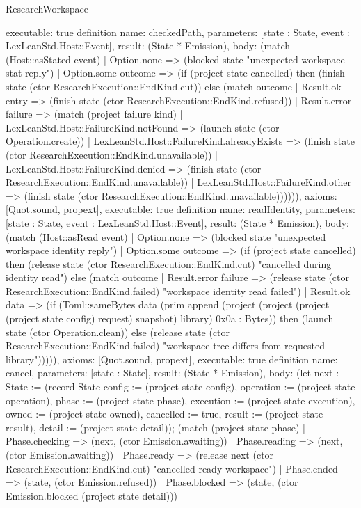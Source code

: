 \begin{lexlean}{ResearchWorkspace}
\begin{semanticmodule}
{ executable: true
}
definition{
 name: checkedPath,
 parameters: [state : State, event : LexLeanStd.Host::Event],
 result: (State * Emission),
 body: (match (Host::asStated event) | Option.none => (blocked state "unexpected workspace stat reply") | Option.some outcome => (if (project state cancelled) then (finish state (ctor ResearchExecution::EndKind.cut)) else (match outcome | Result.ok entry => (finish state (ctor ResearchExecution::EndKind.refused)) | Result.error failure => (match (project failure kind)
 | LexLeanStd.Host::FailureKind.notFound => (launch state (ctor Operation.create))
 | LexLeanStd.Host::FailureKind.alreadyExists => (finish state (ctor ResearchExecution::EndKind.unavailable))
 | LexLeanStd.Host::FailureKind.denied => (finish state (ctor ResearchExecution::EndKind.unavailable))
 | LexLeanStd.Host::FailureKind.other => (finish state (ctor ResearchExecution::EndKind.unavailable)))))),
 axioms: [Quot.sound, propext],
 executable: true
}
definition{
 name: readIdentity,
 parameters: [state : State, event : LexLeanStd.Host::Event],
 result: (State * Emission),
 body: (match (Host::asRead event) | Option.none => (blocked state "unexpected workspace identity reply") | Option.some outcome => (if (project state cancelled) then (release state (ctor ResearchExecution::EndKind.cut) "cancelled during identity read") else (match outcome | Result.error failure => (release state (ctor ResearchExecution::EndKind.failed) "workspace identity read failed") | Result.ok data => (if (Toml::sameBytes data (prim append (project (project (project (project state config) request) snapshot) library) 0x0a : Bytes)) then (launch state (ctor Operation.clean)) else (release state (ctor ResearchExecution::EndKind.failed) "workspace tree differs from requested library"))))),
 axioms: [Quot.sound, propext],
 executable: true
}
definition{
 name: cancel,
 parameters: [state : State],
 result: (State * Emission),
 body: (let next : State := (record State {config := (project state config), operation := (project state operation), phase := (project state phase), execution := (project state execution), owned := (project state owned), cancelled := true, result := (project state result), detail := (project state detail)}); (match (project state phase)
 | Phase.checking => (next, (ctor Emission.awaiting))
 | Phase.reading => (next, (ctor Emission.awaiting))
 | Phase.ready => (release next (ctor ResearchExecution::EndKind.cut) "cancelled ready workspace")
 | Phase.ended => (state, (ctor Emission.refused))
 | Phase.blocked => (state, (ctor Emission.blocked (project state detail)))
}
\end{semanticmodule}
\end{lexlean}
